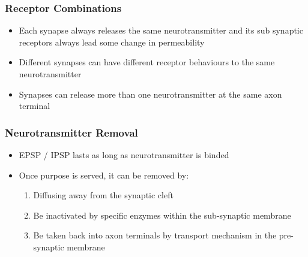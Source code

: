 \documentclass[11pt]{article}
\begin{document}
\subsubsection{Receptor Combinations}
\begin{itemize}
\item Each synapse always releases the same neurotransmitter and its sub synaptic receptors always lead some change in permeability
\item Different synapses can have different receptor behaviours to the same neurotransmitter
\item Synapses can release more than one neurotransmitter at the same axon terminal 
\end{itemize}
\subsubsection{Neurotransmitter Removal}
\begin{itemize}
\item EPSP / IPSP lasts as long as neurotransmitter is binded
\item Once purpose is served, it can be removed by:
\begin{enumerate}
\item Diffusing away from the synaptic cleft
\item Be inactivated by specific enzymes within the sub-synaptic membrane
\item Be taken back into axon terminals by transport mechanism in the pre-synaptic membrane
\end{enumerate}
\end{itemize}
\end{document}
